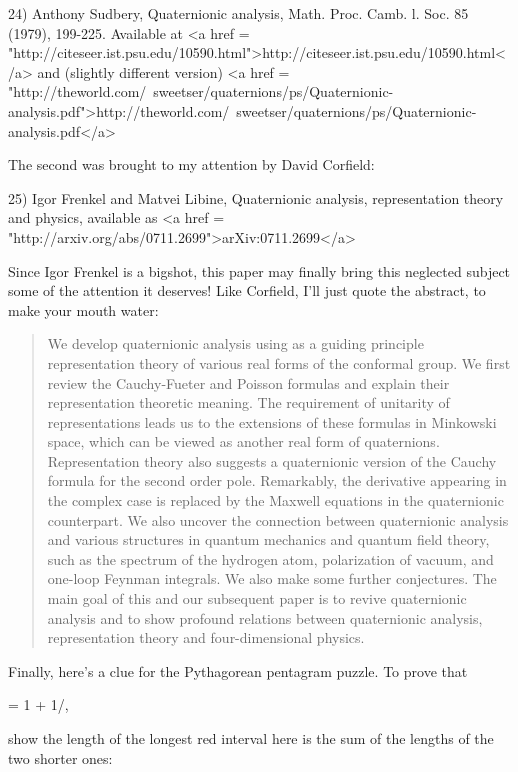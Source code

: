 24) Anthony Sudbery, Quaternionic analysis, Math. Proc. Camb. \Phi l. 
Soc. 85 (1979),  199-225.  Available at 
<a href = "http://citeseer.ist.psu.edu/10590.html">http://citeseer.ist.psu.edu/10590.html</a>
and (slightly different version)
<a href = "http://theworld.com/~sweetser/quaternions/ps/Quaternionic-analysis.pdf">http://theworld.com/~sweetser/quaternions/ps/Quaternionic-analysis.pdf</a>

The second was brought to my attention by David Corfield:

25) Igor Frenkel and Matvei Libine, Quaternionic analysis, 
representation theory and physics, available as <a href = "http://arxiv.org/abs/0711.2699">arXiv:0711.2699</a>

Since Igor Frenkel is a bigshot, this paper may finally bring this
neglected subject some of the attention it deserves!  Like Corfield, 
I'll just quote the abstract, to make your mouth water:

\begin{quote}
  We develop quaternionic analysis using as a guiding principle 
  representation theory of various real forms of the conformal 
  group.  We first review the Cauchy-Fueter and Poisson formulas 
  and explain their representation theoretic meaning.  The 
  requirement of unitarity of representations leads us to the 
  extensions of these formulas in Minkowski space, which can 
  be viewed as another real form of quaternions.  Representation 
  theory also suggests a quaternionic version of the Cauchy formula 
  for the second order pole.  Remarkably, the derivative appearing 
  in the complex case is replaced by the Maxwell equations in the 
  quaternionic counterpart.  We also uncover the connection between 
  quaternionic analysis and various structures in quantum mechanics 
  and quantum field theory, such as the spectrum of the hydrogen atom, 
  polarization of vacuum, and one-loop Feynman integrals.  We also 
  make some further conjectures.  The main goal of this and our 
  subsequent paper is to revive quaternionic analysis and to show 
  profound relations between quaternionic analysis, representation 
  theory and four-dimensional physics.
\end{quote}
    

Finally, here's a clue for the Pythagorean pentagram puzzle.  To 
prove that 

\Phi  = 1 + 1/\Phi ,

show the length of the longest red interval here is the sum of the 
lengths of the two shorter ones:

